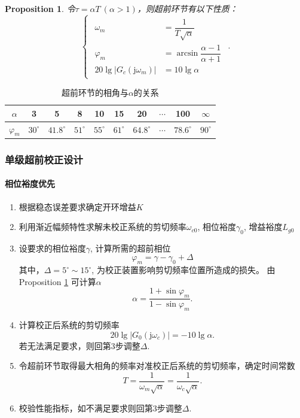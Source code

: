 \documentclass[14pt,a4paper]{article}
\theoremstyle{plain}
\theoremstyle{definition}
\theoremstyle{remark}
\theoremstyle{plain}
\theoremstyle{plain}
\theoremstyle{plain}
\newtheorem{prop}[thm]{Proposition}
\theoremstyle{definition}
\theoremstyle{remark}
\numberwithin{equation}{section}
\begin{document}
				\begin{prop}  
				\label{prop:3-1}
					令$\tau = \alpha T\ (\alpha > 1)$，则超前环节有以下性质：
					\[
					\begin{cases}
						\begin{aligned}
							\omega_m &= \dfrac{1}{T\sqrt{\alpha}} \\
							\varphi_{m} &= \arcsin \dfrac{\alpha-1}{\alpha+1} \\
							20 \lg{\left| G_c(\mathrm{j} \omega_{m}) \right|} &= 10 \lg \alpha 
						\end{aligned}  
					\end{cases} 
					.\] 
				\end{prop} 

				\begin{table}[h]
					\centering
					\caption{超前环节的相角与$\alpha$的关系}
					\label{tab:phi-alpha}
					\begin{tabular}{cccccccccc}
						\hline
						\textbf{$\alpha$} & 3 & 5 & 8 & 10 & 15 & 20 & $\cdots$ & 100 & $\infty$ \\
						\hline 
						\textbf{$\varphi_m$} & $30^\circ$ & $41.8^\circ$ & $51^\circ$ & $55^\circ$ & $61^\circ$ & $64.8^\circ$ & $\cdots$ & $78.6^\circ$ & $90^\circ$ \\ 
						\hline
					\end{tabular}
				\end{table}

			\subsubsection{单级超前校正设计}%
			\label{ssub:单级超前校正设计}
			
				\paragraph{相位裕度优先}%
				\label{par:相位裕度优先}
				
					\begin{enumerate}
						\item 根据稳态误差要求确定开环增益$K$ 
						\item 利用渐近幅频特性求解未校正系统的剪切频率$\omega_{c0}$, 相位裕度$\gamma_0$, 增益裕度$L_{g0}$  
						\item 设要求的相位裕度$\gamma$, 计算所需的超前相位 
							 \[
								 \varphi_m = \gamma - \gamma_0 + \Delta
							\] 
							其中，$\Delta = 5^\circ \sim 15^\circ$, 为校正装置影响剪切频率位置所造成的损失。
							由Proposition \ref{prop:3-1} 可计算$\alpha$ 
							\[
								\alpha = \dfrac{1+\sin \varphi_{m}}{1-\sin \varphi_{m}}
							.\] 
						\item 计算校正后系统的剪切频率 
							\[
								20 \lg \left| G_0(\mathrm{j} \omega_c) \right| = - 10\lg \alpha 
							.\]
							若无法满足要求，则回第3步调整$\Delta$. 
						\item 令超前环节取得最大相角的频率对准校正后系统的剪切频率，确定时间常数 
							\[
							T = \dfrac{1}{\omega_m \sqrt{\alpha}} = \dfrac{1}{\omega_c \sqrt{\alpha}}
							.\]
						\item 校验性能指标，如不满足要求则回第3步调整$\Delta$. 
					\end{enumerate} 
\end{document}
